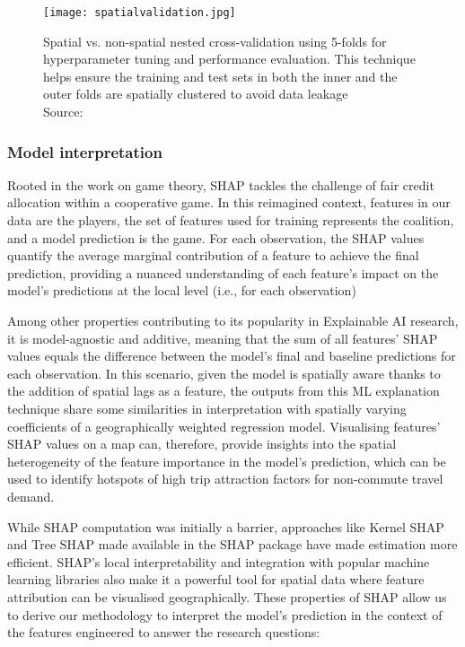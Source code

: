 \begin{figure}[!ht]
    \centering
    \texttt{[image: spatialvalidation.jpg]}
    \captionsetup{justification=centering}
    \caption{Spatial vs. non-spatial nested cross-validation using 5-folds for hyperparameter tuning and performance evaluation. This technique helps ensure the training and test sets in both the inner and the outer folds are spatially clustered to avoid data leakage\\ Source: \citet{schratzPerformanceEvaluationHyperparameter2018}}
    \label{fig:spatialnested}
\end{figure}

\subsubsection*{Model interpretation}

Rooted in the work on game theory, SHAP tackles the challenge of fair credit allocation within a cooperative game. In this reimagined context, features in our data are the players, the set of features used for training represents the coalition, and a model prediction is the game. For each observation, the SHAP values quantify the average marginal contribution of a feature to achieve the final prediction, providing a nuanced understanding of each feature's impact on the model's predictions at the local level (i.e., for each observation)

Among other properties contributing to its popularity in Explainable AI research, it is model-agnostic and additive, meaning that the sum of all features' SHAP values equals the difference between the model's final and baseline predictions for each observation. In this scenario, given the model is spatially aware thanks to the addition of spatial lags as a feature, the outputs from this ML explanation technique share some similarities in interpretation with spatially varying coefficients of a geographically weighted regression model. Visualising features' SHAP values on a map can, therefore, provide insights into the spatial heterogeneity of the feature importance in the model's prediction, which can be used to identify hotspots of high trip attraction factors for non-commute travel demand.

While SHAP computation was initially a barrier, approaches like Kernel SHAP and Tree SHAP made available in the SHAP package have made estimation more efficient. SHAP's local interpretability and integration with popular machine learning libraries also make it a powerful tool for spatial data where feature attribution can be visualised geographically. These properties of SHAP allow us to derive our methodology to interpret the model's prediction in the context of the features engineered to answer the research questions:

